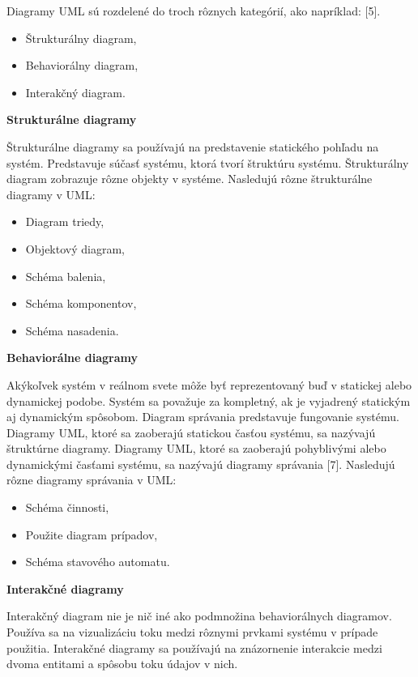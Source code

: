 \documentclass[a4paper]{feidippp}
\begin{document}
Diagramy UML sú rozdelené do troch rôznych kategórií, ako napríklad: [5].

\begin{itemize}
  \item Štrukturálny diagram,
  \item Behaviorálny diagram, 
  \item Interakčný diagram.
\end{itemize}


\textbf {Strukturálne diagramy}

Štrukturálne diagramy sa používajú na predstavenie statického pohľadu na systém. Predstavuje súčasť systému, ktorá tvorí štruktúru systému. Štrukturálny diagram zobrazuje rôzne objekty v systéme.
Nasledujú rôzne štrukturálne diagramy v UML:


\begin{itemize}
  \item Diagram triedy,
  \item Objektový diagram, 
  \item Schéma balenia,
  \item Schéma komponentov,
  \item Schéma nasadenia.
  
\end{itemize}

\textbf {Behaviorálne diagramy}

Akýkoľvek systém v reálnom svete môže byť reprezentovaný buď v statickej alebo dynamickej podobe. Systém sa považuje za kompletný, ak je vyjadrený statickým aj dynamickým spôsobom. Diagram správania predstavuje fungovanie systému.
Diagramy UML, ktoré sa zaoberajú statickou časťou systému, sa nazývajú štruktúrne diagramy. Diagramy UML, ktoré sa zaoberajú pohyblivými alebo dynamickými časťami systému, sa nazývajú diagramy správania [7].
Nasledujú rôzne diagramy správania v UML:

\begin{itemize}
  \item Schéma činnosti,
  \item Použite diagram prípadov, 
  \item Schéma stavového automatu.
  
\end{itemize}



\textbf {Interakčné diagramy}

Interakčný diagram nie je nič iné ako podmnožina behaviorálnych diagramov. Používa sa na vizualizáciu toku medzi rôznymi prvkami systému v prípade použitia. Interakčné diagramy sa používajú na znázornenie interakcie medzi dvoma entitami a spôsobu toku údajov v nich.
\end{document}
